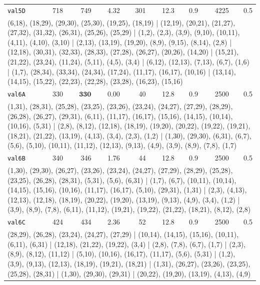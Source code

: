 \begin{longtable}{lrrrrrrrr}
\texttt{val5D} & 718 & 749 & 4.32 & 301 & 12.3 & 0.9 & 4225 & 0.5 \\
\multicolumn{9}{p{0.96\linewidth}}{\tiny\raggedright\arraybackslash (6,18), (18,29), (29,30), (25,30), (19,25), (18,19) | (12,19), (20,21), (21,27), (27,32), (31,32), (26,31), (25,26), (25,29) | (1,2), (2,3), (3,9), (9,10), (10,11), (4,11), (4,10), (3,10) | (2,13), (13,19), (19,20), (8,9), (9,15), (8,14), (2,8) | (12,18), (30,31), (32,33), (28,33), (27,28), (26,27), (20,26), (14,20) | (15,21), (21,22), (23,24), (11,24), (5,11), (4,5), (3,4) | (6,12), (12,13), (7,13), (6,7), (1,6) | (1,7), (28,34), (33,34), (24,34), (17,24), (11,17), (16,17), (10,16) | (13,14), (14,15), (15,22), (22,23), (22,28), (23,28), (16,23), (15,16)} \\[2pt]
\texttt{val6A} & 330 & $\mathbf{330}$ & 0.00 & 40 & 12.8 & 0.9 & 2500 & 0.5 \\
\multicolumn{9}{p{0.96\linewidth}}{\tiny\raggedright\arraybackslash (1,31), (28,31), (25,28), (23,25), (23,26), (23,24), (24,27), (27,29), (28,29), (26,28), (26,27), (29,31), (6,11), (11,17), (16,17), (15,16), (14,15), (10,14), (10,16), (5,31) | (2,8), (8,12), (12,18), (18,19), (19,20), (20,22), (19,22), (19,21), (18,21), (21,22), (13,19), (4,13), (3,4), (2,3), (1,2) | (1,30), (29,30), (6,31), (6,7), (5,6), (5,10), (10,11), (11,12), (12,13), (9,13), (4,9), (3,9), (8,9), (7,8), (1,7)} \\[2pt]
\texttt{val6B} & 340 & 346 & 1.76 & 44 & 12.8 & 0.9 & 2500 & 0.5 \\
\multicolumn{9}{p{0.96\linewidth}}{\tiny\raggedright\arraybackslash (1,30), (29,30), (26,27), (23,26), (23,24), (24,27), (27,29), (28,29), (25,28), (23,25), (26,28), (28,31), (5,31), (5,6), (6,31) | (1,7), (6,7), (10,11), (10,14), (14,15), (15,16), (10,16), (11,17), (16,17), (5,10), (29,31), (1,31) | (2,3), (4,13), (12,13), (12,18), (18,19), (20,22), (19,20), (13,19), (9,13), (4,9), (3,4), (1,2) | (3,9), (8,9), (7,8), (6,11), (11,12), (19,21), (19,22), (21,22), (18,21), (8,12), (2,8)} \\[2pt]
\texttt{val6C} & 424 & 434 & 2.36 & 52 & 12.8 & 0.9 & 2500 & 0.5 \\
\multicolumn{9}{p{0.96\linewidth}}{\tiny\raggedright\arraybackslash (28,29), (26,28), (23,24), (24,27), (27,29) | (10,14), (14,15), (15,16), (10,11), (6,11), (6,31) | (12,18), (21,22), (19,22), (3,4) | (2,8), (7,8), (6,7), (1,7) | (2,3), (8,9), (8,12), (11,12) | (5,10), (10,16), (16,17), (11,17), (5,6), (5,31) | (1,2), (3,9), (9,13), (12,13), (18,19), (19,21), (18,21) | (1,31), (26,27), (23,26), (23,25), (25,28), (28,31) | (1,30), (29,30), (29,31) | (20,22), (19,20), (13,19), (4,13), (4,9)} \\[2pt]

\end{longtable}

